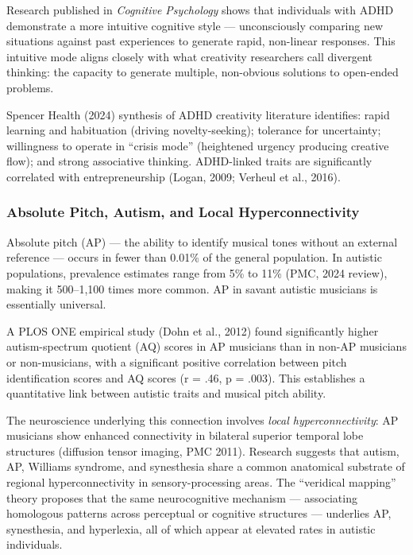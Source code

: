 \documentclass[11pt,letterpaper]{article}
\begin{document}
Research published in \textit{Cognitive Psychology} shows that individuals with ADHD demonstrate a more intuitive cognitive style --- unconsciously comparing new situations against past experiences to generate rapid, non-linear responses. This intuitive mode aligns closely with what creativity researchers call divergent thinking: the capacity to generate multiple, non-obvious solutions to open-ended problems.

Spencer Health (2024) synthesis of ADHD creativity literature identifies: rapid learning and habituation (driving novelty-seeking); tolerance for uncertainty; willingness to operate in ``crisis mode'' (heightened urgency producing creative flow); and strong associative thinking. ADHD-linked traits are significantly correlated with entrepreneurship (Logan, 2009; Verheul et al., 2016).

\subsubsection{Absolute Pitch, Autism, and Local Hyperconnectivity}

Absolute pitch (AP) --- the ability to identify musical tones without an external reference --- occurs in fewer than 0.01\% of the general population. In autistic populations, prevalence estimates range from 5\% to 11\% (PMC, 2024 review), making it 500--1,100 times more common. AP in savant autistic musicians is essentially universal.

A PLOS ONE empirical study (Dohn et al., 2012) found significantly higher autism-spectrum quotient (AQ) scores in AP musicians than in non-AP musicians or non-musicians, with a significant positive correlation between pitch identification scores and AQ scores (r = .46, p = .003). This establishes a quantitative link between autistic traits and musical pitch ability.

The neuroscience underlying this connection involves \textit{local hyperconnectivity}: AP musicians show enhanced connectivity in bilateral superior temporal lobe structures (diffusion tensor imaging, PMC 2011). Research suggests that autism, AP, Williams syndrome, and synesthesia share a common anatomical substrate of regional hyperconnectivity in sensory-processing areas. The ``veridical mapping'' theory proposes that the same neurocognitive mechanism --- associating homologous patterns across perceptual or cognitive structures --- underlies AP, synesthesia, and hyperlexia, all of which appear at elevated rates in autistic individuals.
\end{document}
